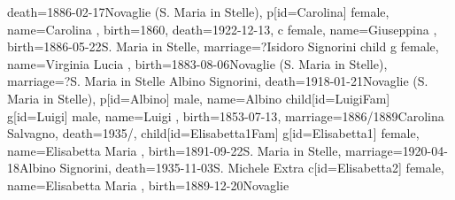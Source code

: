 \documentclass{article}
\begin{document}
\begin{midpage}
\begin{center}
\begin{genealogypicture}
{{{{                death={1886-02-17}{Novaglie (S. Maria in Stelle)},
            }
            p[id=Carolina]{
                female,
                name={Carolina },
                birth={1860}{},
                death={1922-12-13}{},
            }
            c{
                female,
                name={Giuseppina },
                birth={1886-05-22}{S. Maria in Stelle},
                marriage={?}{Isidoro Signorini}
            }
            child{
                g{
                    female,
                    name={Virginia Lucia },
                    birth={1883-08-06}{Novaglie (S. Maria in Stelle)},
                    marriage={?}{S. Maria in Stelle \newline Albino Signorini},
                    death={1918-01-21}{Novaglie (S. Maria in Stelle)},
                }
                p[id=Albino]{
                    male,
                    name={Albino }
                }
            }
        }
        child[id=LuigiFam]{
            g[id=Luigi]{
                male,
                name={Luigi },
                birth={1853-07-13}{},
                marriage={1886/1889}{Carolina Salvagno},
                death={1935/}{},
            }
            child[id=Elisabetta1Fam]{
                g[id=Elisabetta1]{
                    female,
                    name={Elisabetta Maria },
                    birth={1891-09-22}{S. Maria in Stelle},
                    marriage={1920-04-18}{Albino Signorini},
                    death={1935-11-03}{S. Michele Extra}
                }
            }
            c[id=Elisabetta2]{
                female,
                name={Elisabetta Maria },
                birth={1889-12-20}{Novaglie}
            }
        }
    }
}
\end{genealogypicture}

\end{center}
\end{midpage}
\end{document}
